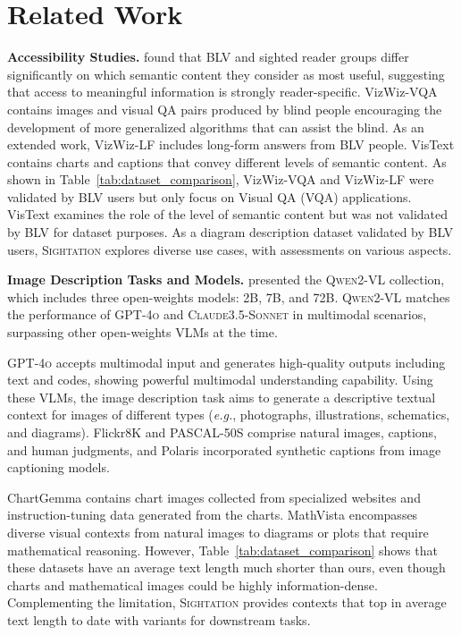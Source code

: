 \section{Related Work}

\textbf{Accessibility Studies.} \citet{9555469} found that BLV and sighted reader groups differ significantly on which semantic content they consider as most useful, suggesting that access to meaningful information is strongly reader-specific. VizWiz-VQA \cite{gurari2018vizwiz} contains images and visual QA pairs produced by blind people encouraging the development of more generalized algorithms that can assist the blind. As an extended work, VizWiz-LF \cite{huh2024long} includes long-form answers from BLV people. VisText \cite{tang2023vistext} contains charts and captions that convey different levels of semantic content. As shown in Table~\ref{tab:dataset_comparison}, VizWiz-VQA and VizWiz-LF were validated by BLV users but only focus on Visual QA (VQA) applications. VisText examines the role of the level of semantic content but was not validated by BLV for dataset purposes. As a diagram description dataset validated by BLV users, \textsc{Sightation} explores diverse use cases, with assessments on various aspects. 

\noindent \textbf{Image Description Tasks and Models.} \citet{wang2024qwen2} presented the \textsc{Qwen2-VL} collection, which includes three open-weights models: 2B, 7B, and 72B. \textsc{Qwen2-VL} matches the performance of \textsc{GPT-4o} and \textsc{Claude3.5-Sonnet} \cite{anthropic2024claude} in multimodal scenarios, surpassing other open-weights VLMs at the time. 

\textsc{GPT-4o} \cite{hurst2024gpt} accepts multimodal input and generates high-quality outputs including text and codes, showing powerful multimodal understanding capability. Using these VLMs, the image description task aims to generate a descriptive textual context for images of different types (\textit{e.g.}, photographs, illustrations, schematics, and diagrams). Flickr8K and PASCAL-50S comprise natural images, captions, and human judgments\cite{hodosh2013framing, vedantam2015cider}, and Polaris \cite{wada2024polos} incorporated synthetic captions from image captioning models.

ChartGemma \cite{masry2024chartgemma} contains chart images collected from specialized websites and instruction-tuning data generated from the charts. MathVista \cite{lu2023mathvista} encompasses diverse visual contexts from natural images to diagrams or plots that require mathematical reasoning. However, Table~\ref{tab:dataset_comparison} shows that these datasets have an average text length much shorter than ours, even though charts and mathematical images could be highly information-dense. Complementing the limitation, \textsc{Sightation} provides contexts that top in average text length to date with variants for downstream tasks.

